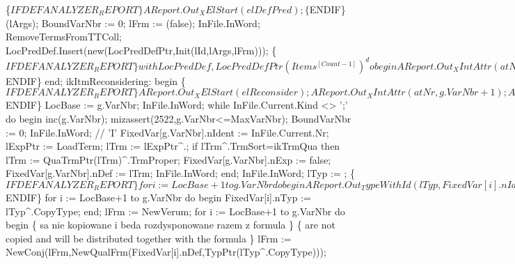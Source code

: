             \{$IFDEF ANALYZER_REPORT\}
            AReport.Out_XElStart(elDefPred);
            \{$ENDIF\}
            (lArgs);
            BoundVarNbr := 0;
            lFrm := (false);
            InFile.InWord;
            RemoveTermsFromTTColl;
            LocPredDef.Insert(new(LocPredDefPtr,Init(lId,lArgs,lFrm)));
            \{$IFDEF ANALYZER_REPORT\}
            with LocPredDef,LocPredDefPtr(Items^[Count-1])^ do
            begin
               AReport.Out_XIntAttr(atNr, Count);
               AReport.Out_XIntAttr(atVid, lId);
               AReport.Out_XAttrEnd;
               AReport.Out_ArgTypes(fPrimaries);
               AReport.Out_Formula(fPredDef);
               AReport.Out_XElEnd(elDefPred);
            end;
            \{$ENDIF\}
         end;
      ikItmReconsidering:
         begin
            \{$IFDEF ANALYZER_REPORT\}
            AReport.Out_XElStart(elReconsider);
            AReport.Out_XIntAttr(atNr, g.VarNbr+1);
            AReport.Out_XAttrEnd;
            \{$ENDIF\}
            LocBase := g.VarNbr;
            InFile.InWord;
            while InFile.Current.Kind <> ';' do
            begin
               inc(g.VarNbr); mizassert(2522,g.VarNbr<=MaxVarNbr);
               BoundVarNbr := 0;
               InFile.InWord;  // 'I'
               FixedVar[g.VarNbr].nIdent := InFile.Current.Nr;
               lExpPtr := LoadTerm;
               lTrm := lExpPtr^.;
               if lTrm^.TrmSort=ikTrmQua then lTrm := QuaTrmPtr(lTrm)^.TrmProper;
               FixedVar[g.VarNbr].nExp := false;
               FixedVar[g.VarNbr].nDef := lTrm;
               InFile.InWord;
            end;
            InFile.InWord;
            lTyp := ;
            \{$IFDEF ANALYZER_REPORT\}
            for i := LocBase+1 to g.VarNbr do
            begin
               AReport.Out_TypeWithId(lTyp, FixedVar[i].nIdent);
               AReport.Out_Term(FixedVar[i].nDef);
            end;
            \{$ENDIF\}
            for i := LocBase+1 to g.VarNbr do
            begin
               FixedVar[i].nTyp := lTyp^.CopyType;
            end;
            lFrm := NewVerum;
            for i := LocBase+1 to g.VarNbr do
            begin
               \{ sa nie kopiowane i beda rozdysponowane razem z formula \}
               \{ are not copied and will be distributed together with the formula \}
               lFrm := NewConj(lFrm,NewQualFrm(FixedVar[i].nDef,TypPtr(lTyp^.CopyType)));
